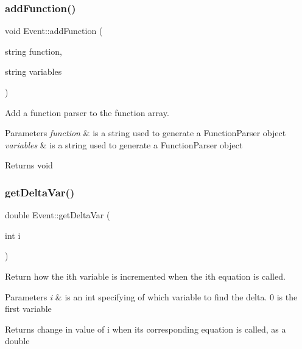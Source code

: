 \subsubsection{\texorpdfstring{add\+Function()}{addFunction()}}
{\footnotesize\ttfamily void Event\+::add\+Function (\begin{DoxyParamCaption}\item[{string}]{function,  }\item[{string}]{variables }\end{DoxyParamCaption})}



Add a function parser to the function array. 


\begin{DoxyParams}{Parameters}
{\em function} & is a string used to generate a Function\+Parser object \\
\hline
{\em variables} & is a string used to generate a Function\+Parser object \\
\hline
\end{DoxyParams}
\begin{DoxyReturn}{Returns}
void 
\end{DoxyReturn}
\mbox{\label{class_event_afb753b1954fd16e7ba92ae16157f70fd}} 
\subsubsection{\texorpdfstring{get\+Delta\+Var()}{getDeltaVar()}}
{\footnotesize\ttfamily double Event\+::get\+Delta\+Var (\begin{DoxyParamCaption}\item[{int}]{i }\end{DoxyParamCaption})}



Return how the ith variable is incremented when the ith equation is called. 


\begin{DoxyParams}{Parameters}
{\em i} & is an int specifying of which variable to find the delta. 0 is the first variable \\
\hline
\end{DoxyParams}
\begin{DoxyReturn}{Returns}
change in value of i when its corresponding equation is called, as a double 
\end{DoxyReturn}
\mbox{\label{class_event_a2288e3b3fa19e076e04bba11b88d189a}} 
